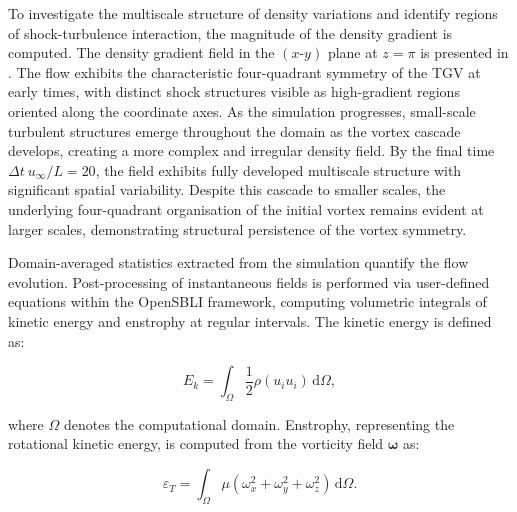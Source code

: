 To investigate the multiscale structure of density variations and identify regions of shock-turbulence interaction, the magnitude of the density gradient is computed. The density gradient field in the $(x\text{-}y)$ plane at $z = \pi$ is presented in . The flow exhibits the characteristic four-quadrant symmetry of the \gls{TGV} at early times, with distinct shock structures visible as high-gradient regions oriented along the coordinate axes. As the simulation progresses, small-scale turbulent structures emerge throughout the domain as the vortex cascade develops, creating a more complex and irregular density field. By the final time $\Delta t \ u_{\infty}/L = 20$, the field exhibits fully developed multiscale structure with significant spatial variability. Despite this cascade to smaller scales, the underlying four-quadrant organisation of the initial vortex remains evident at larger scales, demonstrating structural persistence of the vortex symmetry. 


Domain-averaged statistics extracted from the simulation quantify the flow evolution. Post-processing of instantaneous fields is performed via user-defined equations within the OpenSBLI framework, computing volumetric integrals of kinetic energy and enstrophy at regular intervals. The kinetic energy is defined as:

\begin{equation}
E_k = \int_{\Omega} \frac{1}{2}\rho \left(u_i u_i\right) \, \mathrm{d}\Omega,
\end{equation}


where $\Omega$ denotes the computational domain. Enstrophy, representing the rotational kinetic energy, is computed from the vorticity field $\boldsymbol{\omega}$ as:

\begin{equation}
\varepsilon_T = \int_{\Omega} \mu \left(\omega_x^2 + \omega_y^2 + \omega_z^2\right) \, \mathrm{d}\Omega.
\end{equation}



